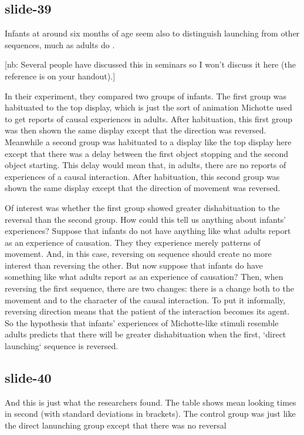 \documentclass[12pt,\papersize]{extarticle}
\begin{document}
\subsection{slide-39}
Infants at around six months of age seem also to distinguish launching from other sequences, 
much as adults do \citep{Leslie:1987nr}.
 
[nb: Several people have discussed this in seminars so I won't discuss it here (the reference is on your handout).]
 
In their experiment, they compared two groups of infants.
The first group was habituated to the top display, which is just the sort of animation Michotte
used to get reports of causal experiences in adults.
After habituation, this first group was then shown the same display except that the direction was 
reversed.
Meanwhile a second group was habituated to a display like the top display here except 
that there was a delay between the first object stopping and the second object starting.
This delay would mean that, in adults, there are no reports of experiences of a causal interaction.
After habituation, this second group was shown the same display except that the direction of 
movement was reversed.
 
Of interest was whether the first group showed greater dishabituation to the reversal than 
the second group.
How could this tell us anything about infants' experiences?
Suppose that infants do not have anything like what adults report as an experience of causation.
They they experience merely patterns of movement.
And, in this case, reversing on sequence should create no more interest than reversing the other.
But now suppose that infants do have something like what adults report as an experience 
of causation?
Then, when reversing the first sequence, there are two changes: there is a change both to the 
movement and to the character of the causal interaction.  To put it informally,
reversing direction means that the patient of the interaction becomes its agent.
So the hypothesis that infants' experiences of Michotte-like stimuli resemble adults 
predicts that there will be greater dishabituation when the first, `direct launching` sequence 
is reversed.
 
\subsection{slide-40}
And this is just what the researchers found.
The table shows mean looking times in second (with standard deviations in brackets).
The control group was just like the direct lanunching group except that there was no reversal
 
\end{document}
